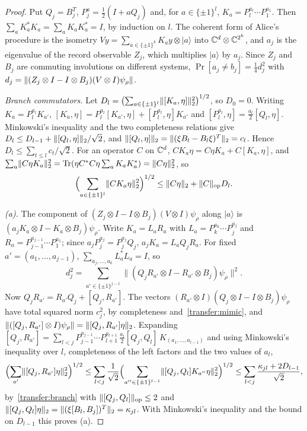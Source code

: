 \begin{proof}
Put $Q_j=B_j^T$, $P^a_j=\frac12(I+aQ_j)$ and, for $a\in\{\pm1\}^l$, $K_a=P^{a_l}_l\cdots P^{a_1}_1$. Then
$\sum_aK_a^*K_a=\sum_aK_aK_a^*=I$, by induction on $l$. The coherent form of Alice's procedure is the isometry
$Vy=\sum_{a\in\{\pm1\}^k}K_ay\otimes|a\rangle$ into $\mathbb C^d\otimes\mathbb C^{2^k}$, and $a_j$ is the eigenvalue of the record observable $Z_j$, which
multiplies $|a\rangle$ by $a_j$. Since $Z_j$ and $B_j$ are commuting involutions on different systems, $\Pr[a_j\ne b_j]=\frac14d_j^2$ with
$d_j=\lVert (Z_j\otimes I-I\otimes B_j)(V\otimes I)\psi_\rho\rVert$.

\emph{Branch commutators.} Let $D_l=\bigl(\sum_{a\in\{\pm1\}^l}\lVert [K_a,\eta]\rVert_2^2\bigr)^{1/2}$, so $D_0=0$. Writing $K_a=P^{a_l}_lK_{a'}$,
$[K_a,\eta]=P^{a_l}_l[K_{a'},\eta]+[P^{a_l}_l,\eta]K_{a'}$ and $[P^{a_l}_l,\eta]=\frac{a_l}2[Q_l,\eta]$. Minkowski's inequality and the two
completeness relations give $D_l\le D_{l-1}+\lVert [Q_l,\eta]\rVert_2/\sqrt2$, and $\lVert [Q_l,\eta]\rVert_2=\lVert (\xi B_l-B_l\xi)^T\rVert_2=c_l$. Hence
$D_l\le\sum_{t\le l}c_t/\sqrt2$. For an operator $C$ on $\mathbb C^d$, $CK_a\eta=C\eta K_a+C[K_a,\eta]$, and
$\sum_a\lVert C\eta K_a\rVert_2^2=\operatorname{Tr}(\eta C^*C\eta\sum_aK_aK_a^*)=\lVert C\eta\rVert_2^2$, so
\begin{equation}\label{transfer:branch}
\Bigl(\sum_{a\in\{\pm1\}^l}\lVert CK_a\eta\rVert_2^2\Bigr)^{1/2}\le\lVert C\eta\rVert_2+\lVert C\rVert_{\mathrm{op}}D_l .
\end{equation}

\emph{(a).} The component of $(Z_j\otimes I-I\otimes B_j)(V\otimes I)\psi_\rho$ along $|a\rangle$ is $(a_jK_a\otimes I-K_a\otimes B_j)\psi_\rho$.
Write $K_a=L_aR_a$ with $L_a=P^{a_k}_k\cdots P^{a_j}_j$ and $R_a=P^{a_{j-1}}_{j-1}\cdots P^{a_1}_1$; since $a_jP^{a_j}_j=P^{a_j}_jQ_j$,
$a_jK_a=L_aQ_jR_a$. For fixed $a'=(a_1,\dots,a_{j-1})$, $\sum_{a_j,\dots,a_k}L_a^*L_a=I$, so
\[
d_j^2=\sum_{a'\in\{\pm1\}^{j-1}}\bigl\|(Q_jR_{a'}\otimes I-R_{a'}\otimes B_j)\psi_\rho\bigr\|^2 .
\]
Now $Q_jR_{a'}=R_{a'}Q_j+[Q_j,R_{a'}]$. The vectors $(R_{a'}\otimes I)(Q_j\otimes I-I\otimes B_j)\psi_\rho$ have total squared norm $c_j^2$, by
completeness and~\eqref{transfer:mimic}, and $\lVert ([Q_j,R_{a'}]\otimes I)\psi_\rho\rVert=\lVert [Q_j,R_{a'}]\eta\rVert_2$. Expanding
$[Q_j,R_{a'}]=\sum_{l<j}P^{a_{j-1}}_{j-1}\cdots P^{a_{l+1}}_{l+1}\,\frac{a_l}2[Q_j,Q_l]\,K_{(a_1,\dots,a_{l-1})}$ and using Minkowski's
inequality over $l$, completeness of the left factors and the two values of $a_l$,
\[
\Bigl(\sum_{a'}\lVert [Q_j,R_{a'}]\eta\rVert_2^2\Bigr)^{1/2}\le\sum_{l<j}\frac1{\sqrt2}\Bigl(\sum_{a''\in\{\pm1\}^{l-1}}\lVert [Q_j,Q_l]K_{a''}\eta\rVert_2^2\Bigr)^{1/2}
\le\sum_{l<j}\frac{\kappa_{jl}+2D_{l-1}}{\sqrt2},
\]
by~\eqref{transfer:branch} with $\lVert [Q_j,Q_l]\rVert_{\mathrm{op}}\le2$ and $\lVert [Q_j,Q_l]\eta\rVert_2=\lVert (\xi[B_l,B_j])^T\rVert_2=\kappa_{jl}$. With Minkowski's inequality
and the bound on $D_{l-1}$ this proves (a).


\end{proof}
